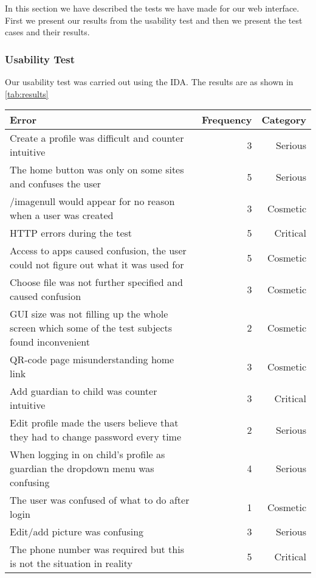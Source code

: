 In this section we have described the tests we have made for our web interface. First we present our results from the usability test and then we present the test cases and their results.

\subsubsection{Usability Test}

Our usability test was carried out using the IDA. The results are as shown in \autoref{tab:results}

\begin{table}[H]
	\scriptsize
	\centering
	\begin{tabular}{|p{7cm}|r|r|}
		\hline
		Error & Frequency & Category \\
		\hline
		\hline
		Create a profile was difficult and counter intuitive & 3 & Serious \\ \hline
		The home button was only on some sites and confuses the user & 5 & Serious \\ \hline
		/imagenull would appear for no reason when a user was created & 3 & Cosmetic \\ \hline
		HTTP errors during the test & 5 & Critical \\ \hline
		Access to apps caused confusion, the user could not figure out what it was used for & 5 & Cosmetic \\ \hline
		Choose file was not further specified and caused confusion & 3 & Cosmetic \\ \hline
		GUI size was not filling up the whole screen which some of the test subjects found inconvenient & 2 & Cosmetic \\ \hline
		QR-code page misunderstanding home link & 3 & Cosmetic \\ \hline
		Add guardian to child was counter intuitive & 3 & Critical \\ \hline
		Edit profile made the users believe that they had to change password every time & 2 & Serious \\ \hline
		When logging in on child's profile as guardian the dropdown menu was confusing & 4 & Serious \\ \hline
		The user was confused of what to do after login & 1 & Cosmetic \\ \hline
		Edit/add picture was confusing & 3 & Serious \\ \hline
		The phone number was required but this is not the situation in reality & 5 & Critical \\ \hline

\end{tabular}
\end{table}
